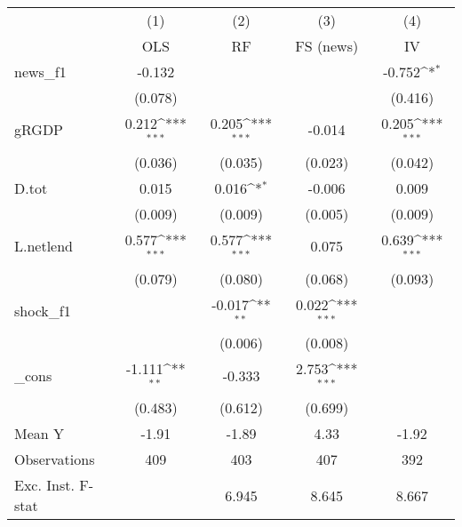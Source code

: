 {
\def\sym#1{\ifmmode^{#1}\else\(^{#1}\)\fi}
\begin{tabular}{l*{4}{c}}
\toprule
            &\multicolumn{1}{c}{(1)}&\multicolumn{1}{c}{(2)}&\multicolumn{1}{c}{(3)}&\multicolumn{1}{c}{(4)}\\
            &\multicolumn{1}{c}{OLS}&\multicolumn{1}{c}{RF}&\multicolumn{1}{c}{FS (news)}&\multicolumn{1}{c}{IV}\\
\midrule
news\_f1     &      -0.132         &                     &                     &      -0.752\sym{*}  \\
            &     (0.078)         &                     &                     &     (0.416)         \\
\addlinespace
gRGDP       &       0.212\sym{***}&       0.205\sym{***}&      -0.014         &       0.205\sym{***}\\
            &     (0.036)         &     (0.035)         &     (0.023)         &     (0.042)         \\
\addlinespace
D.tot       &       0.015         &       0.016\sym{*}  &      -0.006         &       0.009         \\
            &     (0.009)         &     (0.009)         &     (0.005)         &     (0.009)         \\
\addlinespace
L.netlend   &       0.577\sym{***}&       0.577\sym{***}&       0.075         &       0.639\sym{***}\\
            &     (0.079)         &     (0.080)         &     (0.068)         &     (0.093)         \\
\addlinespace
shock\_f1    &                     &      -0.017\sym{**} &       0.022\sym{***}&                     \\
            &                     &     (0.006)         &     (0.008)         &                     \\
\addlinespace
\_cons      &      -1.111\sym{**} &      -0.333         &       2.753\sym{***}&                     \\
            &     (0.483)         &     (0.612)         &     (0.699)         &                     \\
\midrule
Mean Y      &       -1.91         &       -1.89         &        4.33         &       -1.92         \\
Observations&         409         &         403         &         407         &         392         \\
Exc. Inst. F-stat&                     &       6.945         &       8.645         &       8.667         \\
\bottomrule
\end{tabular}
}
